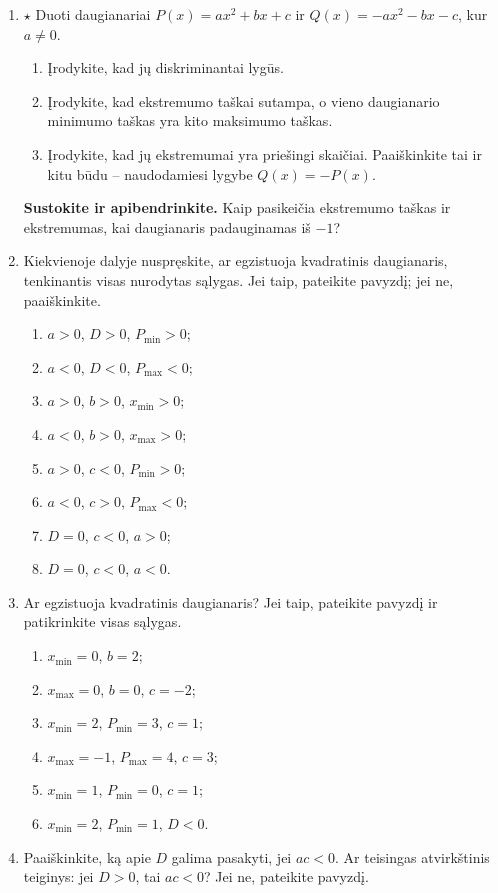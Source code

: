 \documentclass[12pt,a4paper]{article}
\begin{document}
\begin{enumerate}
\begin{enumerate}
\end{enumerate}
\item $\star$ Duoti daugianariai $P(x)=ax^2+bx+c$ ir $Q(x)=-ax^2-bx-c$, kur $a\ne0$.
\begin{enumerate}
\item Įrodykite, kad jų diskriminantai lygūs.
\item Įrodykite, kad ekstremumo taškai sutampa, o vieno daugianario minimumo taškas yra kito maksimumo taškas.
\item Įrodykite, kad jų ekstremumai yra priešingi skaičiai. Paaiškinkite tai ir kitu būdu – naudodamiesi lygybe $Q(x)=-P(x)$.
\end{enumerate}
\par\medskip
\textbf{Sustokite ir apibendrinkite.} Kaip pasikeičia ekstremumo taškas ir ekstremumas, kai daugianaris padauginamas iš $-1$?
\item Kiekvienoje dalyje nuspręskite, ar egzistuoja kvadratinis daugianaris, tenkinantis visas nurodytas sąlygas. Jei taip, pateikite pavyzdį; jei ne, paaiškinkite.
\begin{enumerate}
\item $a>0$, $D>0$, $P_{\min}>0$;
\item $a<0$, $D<0$, $P_{\max}<0$;
\item $a>0$, $b>0$, $x_{\min}>0$;
\item $a<0$, $b>0$, $x_{\max}>0$;
\item $a>0$, $c<0$, $P_{\min}>0$;
\item $a<0$, $c>0$, $P_{\max}<0$;
\item $D=0$, $c<0$, $a>0$;
\item $D=0$, $c<0$, $a<0$.
\end{enumerate}
\item Ar egzistuoja kvadratinis daugianaris? Jei taip, pateikite pavyzdį ir patikrinkite visas sąlygas.
\begin{enumerate}
\item $x_{\min}=0$, $b=2$;
\item $x_{\max}=0$, $b=0$, $c=-2$;
\item $x_{\min}=2$, $P_{\min}=3$, $c=1$;
\item $x_{\max}=-1$, $P_{\max}=4$, $c=3$;
\item $x_{\min}=1$, $P_{\min}=0$, $c=1$;
\item $x_{\min}=2$, $P_{\min}=1$, $D<0$.
\end{enumerate}
\item Paaiškinkite, ką apie $D$ galima pasakyti, jei $ac<0$. Ar teisingas atvirkštinis teiginys: jei $D>0$, tai $ac<0$? Jei ne, pateikite pavyzdį.

\end{enumerate}
\end{document}
